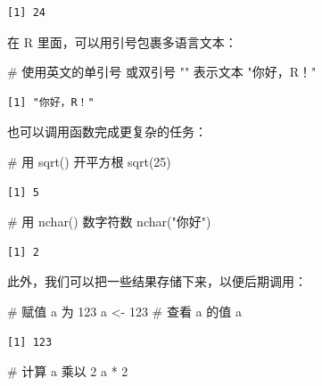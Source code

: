 \documentclass[
  letterpaper,
]{ctexbook}
\newenvironment{Shaded}{\begin{snugshade}}{\end{snugshade}}
\newcommand{\CommentTok}[1]{\textcolor[rgb]{0.37,0.37,0.37}{#1}}
\newcommand{\DecValTok}[1]{\textcolor[rgb]{0.68,0.00,0.00}{#1}}
\newcommand{\FunctionTok}[1]{\textcolor[rgb]{0.28,0.35,0.67}{#1}}
\newcommand{\NormalTok}[1]{\textcolor[rgb]{0.00,0.23,0.31}{#1}}
\newcommand{\OtherTok}[1]{\textcolor[rgb]{0.00,0.23,0.31}{#1}}
\newcommand{\SpecialCharTok}[1]{\textcolor[rgb]{0.37,0.37,0.37}{#1}}
\newcommand{\StringTok}[1]{\textcolor[rgb]{0.13,0.47,0.30}{#1}}
\begin{document}
\begin{verbatim}
[1] 24
\end{verbatim}

在 R 里面，可以用引号包裹多语言文本：

\begin{Shaded}
\begin{Highlighting}[]
\CommentTok{\# 使用英文的单引号 \textquotesingle{}\textquotesingle{} 或双引号 "" 表示文本}
\StringTok{"你好，R！"}
\end{Highlighting}
\end{Shaded}

\begin{verbatim}
[1] "你好，R！"
\end{verbatim}

也可以调用函数完成更复杂的任务：

\begin{Shaded}
\begin{Highlighting}[]
\CommentTok{\# 用 sqrt() 开平方根}
\FunctionTok{sqrt}\NormalTok{(}\DecValTok{25}\NormalTok{)}
\end{Highlighting}
\end{Shaded}

\begin{verbatim}
[1] 5
\end{verbatim}

\begin{Shaded}
\begin{Highlighting}[]
\CommentTok{\# 用 nchar() 数字符数}
\FunctionTok{nchar}\NormalTok{(}\StringTok{"你好"}\NormalTok{)}
\end{Highlighting}
\end{Shaded}

\begin{verbatim}
[1] 2
\end{verbatim}

此外，我们可以把一些结果存储下来，以便后期调用：

\begin{Shaded}
\begin{Highlighting}[]
\CommentTok{\# 赋值 a 为 123}
\NormalTok{a }\OtherTok{\textless{}{-}} \DecValTok{123}
\CommentTok{\# 查看 a 的值}
\NormalTok{a}
\end{Highlighting}
\end{Shaded}

\begin{verbatim}
[1] 123
\end{verbatim}

\begin{Shaded}
\begin{Highlighting}[]
\CommentTok{\# 计算 a 乘以 2}
\NormalTok{a }\SpecialCharTok{*} \DecValTok{2}
\end{Highlighting}
\end{Shaded}
\end{document}
